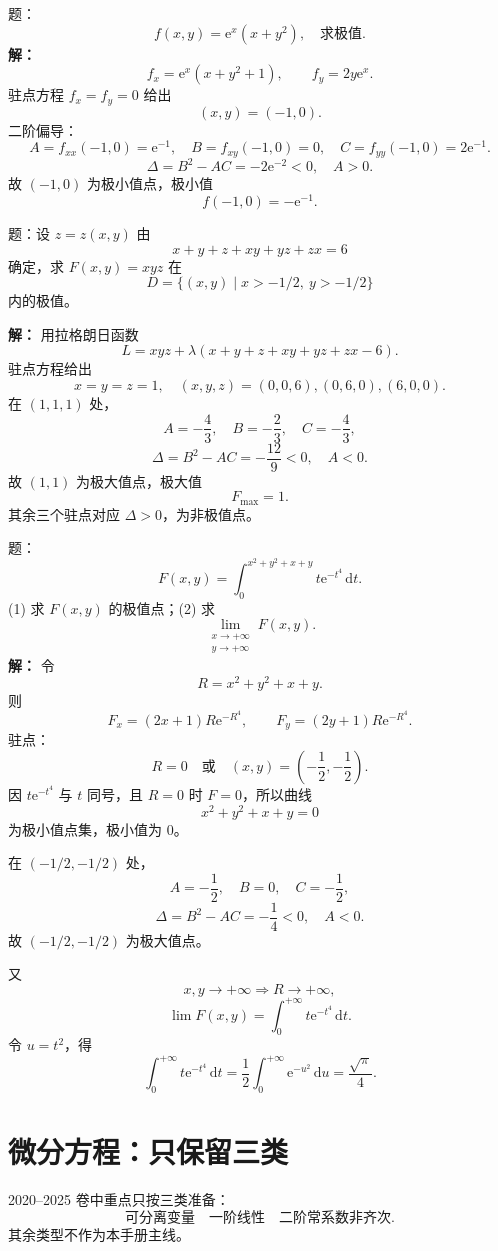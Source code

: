 \documentclass[11pt,a4paper,UTF8]{ctexart}
\newcommand{\dd}{\,\mathrm d}
\newcommand{\ee}{\mathrm e}
\begin{document}
\begin{answerbox}[2020--2021 计算 3：普通二元极值]
题：
\[
f(x,y)=\ee^x(x+y^2),\quad \text{求极值}.
\]
\textbf{解：}
\[
f_x=\ee^x(x+y^2+1),\qquad f_y=2y\ee^x.
\]
驻点方程 \(f_x=f_y=0\) 给出
\[
(x,y)=(-1,0).
\]
二阶偏导：
\[
A=f_{xx}(-1,0)=\ee^{-1},\quad
B=f_{xy}(-1,0)=0,\quad
C=f_{yy}(-1,0)=2\ee^{-1}.
\]
\[
\Delta=B^2-AC=-2\ee^{-2}<0,\quad A>0.
\]
故 \((-1,0)\) 为极小值点，极小值
\[
\boxed{f(-1,0)=-\ee^{-1}}.
\]
\end{answerbox}

\begin{answerbox}[2021--2022 大题：隐约束极值]
题：设 \(z=z(x,y)\) 由
\[
x+y+z+xy+yz+zx=6
\]
确定，求 \(F(x,y)=xyz\) 在
\[
D=\{(x,y)\mid x>-1/2,\ y>-1/2\}
\]
内的极值。

\textbf{解：}
用拉格朗日函数
\[
L=xyz+\lambda(x+y+z+xy+yz+zx-6).
\]
驻点方程给出
\[
x=y=z=1,\quad (x,y,z)=(0,0,6),(0,6,0),(6,0,0).
\]
在 \((1,1,1)\) 处，
\[
A=-\frac43,\quad B=-\frac23,\quad C=-\frac43,
\]
\[
\Delta=B^2-AC=-\frac{12}{9}<0,\quad A<0.
\]
故 \((1,1)\) 为极大值点，极大值
\[
\boxed{F_{\max}=1}.
\]
其余三个驻点对应 \(\Delta>0\)，为非极值点。
\end{answerbox}

\begin{answerbox}
题：
\[
F(x,y)=\int_0^{x^2+y^2+x+y}t\ee^{-t^4}\dd t.
\]
(1) 求 \(F(x,y)\) 的极值点；(2) 求
\[
\lim_{\substack{x\to+\infty\\y\to+\infty}}F(x,y).
\]
\textbf{解：}
令
\[
R=x^2+y^2+x+y.
\]
则
\[
F_x=(2x+1)R\ee^{-R^4},\qquad
F_y=(2y+1)R\ee^{-R^4}.
\]
驻点：
\[
R=0
\quad\text{或}\quad
\left(x,y\right)=\left(-\frac12,-\frac12\right).
\]
因 \(t\ee^{-t^4}\) 与 \(t\) 同号，且 \(R=0\) 时 \(F=0\)，所以曲线
\[
x^2+y^2+x+y=0
\]
为极小值点集，极小值为 \(0\)。

在 \((-1/2,-1/2)\) 处，
\[
A=-\frac12,\quad B=0,\quad C=-\frac12,
\]
\[
\Delta=B^2-AC=-\frac14<0,\quad A<0.
\]
故 \((-1/2,-1/2)\) 为极大值点。

又
\[
x,y\to+\infty\Rightarrow R\to+\infty,
\]
\[
\lim F(x,y)=\int_0^{+\infty}t\ee^{-t^4}\dd t.
\]
令 \(u=t^2\)，得
\[
\int_0^{+\infty}t\ee^{-t^4}\dd t
=\frac12\int_0^{+\infty}\ee^{-u^2}\dd u
=\boxed{\frac{\sqrt\pi}{4}}.
\]
\end{answerbox}
\section{微分方程：只保留三类}

\begin{identifybox}[识别]
2020--2025 卷中重点只按三类准备：
\[
\text{可分离变量}\quad
\text{一阶线性}\quad
\text{二阶常系数非齐次}.
\]
其余类型不作为本手册主线。
\end{identifybox}
\end{document}
